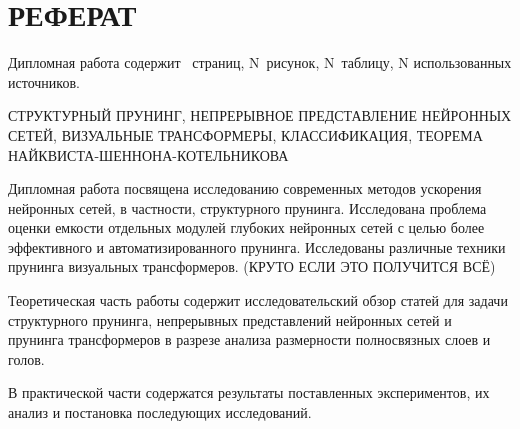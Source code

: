 \chapter*{РЕФЕРАТ}

\bigskip\par
Дипломная работа содержит \pageref*{LastPage}~страниц, N~рисунок,                                        N~таблицу, N использованных источников.

\bigskip\par
СТРУКТУРНЫЙ ПРУНИНГ, НЕПРЕРЫВНОЕ ПРЕДСТАВЛЕНИЕ НЕЙРОННЫХ СЕТЕЙ, ВИЗУАЛЬНЫЕ ТРАНСФОРМЕРЫ, КЛАССИФИКАЦИЯ, ТЕОРЕМА НАЙКВИСТА-ШЕННОНА-КОТЕЛЬНИКОВА

\bigskip\par
Дипломная работа посвящена исследованию современных методов ускорения нейронных сетей, в частности, структурного прунинга. Исследована проблема оценки емкости отдельных модулей глубоких нейронных сетей с целью более эффективного и автоматизированного прунинга. Исследованы различные техники прунинга визуальных трансформеров. (КРУТО ЕСЛИ ЭТО ПОЛУЧИТСЯ ВСЁ)

\bigskip
Теоретическая часть работы содержит исследовательский обзор статей для задачи структурного прунинга, непрерывных представлений нейронных сетей и прунинга трансформеров в разрезе анализа размерности полносвязных слоев и голов.

\bigskip
В практической части содержатся результаты поставленных экспериментов, их анализ и постановка последующих исследований.
